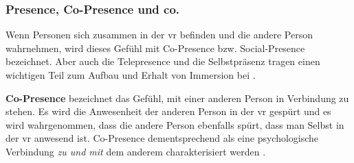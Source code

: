 \documentclass[a4paper,11pt]{article}%
\renewcommand{\\}{\vspace*{0.5\baselineskip} \newline}
\begin{document}
%			
			


		\subsubsection{Presence, Co-Presence und co.}
Wenn Personen sich zusammen in der \ac{vr} befinden und die andere Person wahrnehmen, wird dieses Gefühl mit \dq{}Co-Presence\dq{} bzw. \dq{}Social-Presence\dq{} bezeichnet. Aber auch die \dq{}Telepresence\dq{} und die \dq{}Selbstpräsenz\dq{} tragen einen wichtigen Teil zum Aufbau und Erhalt von Immersion bei \citep{schuemie2001research}.

\textbf{\dq Co-Presence\dq{}} bezeichnet das Gefühl, mit einer anderen Person in Verbindung zu stehen.
Es wird die Anwesenheit der anderen Person in der \ac{vr} gespürt und es wird wahrgenommen, dass die andere Person ebenfalls spürt, dass man Selbst in der \ac{vr} anwesend ist. 
Co-Presence dementsprechend als eine psychologische Verbindung \textit{zu und mit} dem anderem charakterisiert werden \citep[179-182]{ijsselsteijn2001presence}.
\end{document}
